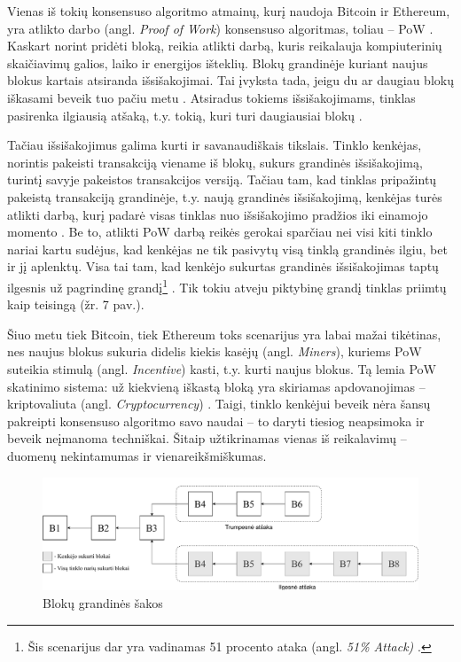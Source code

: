 Vienas iš tokių konsensuso algoritmo atmainų, kurį naudoja Bitcoin ir Ethereum, yra atlikto darbo (angl. \textit{Proof of Work}) konsensuso algoritmas, toliau – PoW \cite{gervais2016security}. Kaskart norint pridėti bloką, reikia atlikti darbą, kuris reikalauja kompiuterinių skaičiavimų galios, laiko ir energijos išteklių. Blokų grandinėje kuriant naujus blokus kartais atsiranda išsišakojimai. Tai įvyksta tada, jeigu du ar daugiau blokų iškasami beveik tuo pačiu metu \cite{zheng2017overview}. Atsiradus tokiems išsišakojimams, tinklas pasirenka ilgiausią atšaką, t.y. tokią, kuri turi daugiausiai blokų \cite{zheng2017overview}. 

Tačiau išsišakojimus galima kurti ir savanaudiškais tikslais. Tinklo kenkėjas, norintis pakeisti transakciją viename iš blokų, sukurs grandinės išsišakojimą, turintį savyje pakeistos transakcijos versiją. Tačiau tam, kad tinklas pripažintų pakeistą transakciją grandinėje, t.y. naują grandinės išsišakojimą, kenkėjas turės atlikti darbą, kurį padarė visas tinklas nuo išsišakojimo pradžios iki einamojo momento \cite{nakamoto2008bitcoin}. Be to, atlikti PoW darbą reikės gerokai sparčiau nei visi kiti tinklo nariai kartu sudėjus, kad kenkėjas ne tik pasivytų visą tinklą grandinės ilgiu, bet ir jį aplenktų. Visa tai tam, kad kenkėjo sukurtas grandinės išsišakojimas taptų ilgesnis už pagrindinę grandį\footnote{Šis scenarijus dar yra vadinamas 51 procento ataka (angl. \textit{51\% Attack)} \cite{baliga2017understanding}.} \cite{nakamoto2008bitcoin}. Tik tokiu atveju piktybinę grandį tinklas priimtų kaip teisingą (žr. 7 pav.).

Šiuo metu tiek Bitcoin, tiek Ethereum toks scenarijus yra labai mažai tikėtinas, nes naujus blokus sukuria didelis kiekis kasėjų (angl. \textit{Miners}), kuriems PoW suteikia stimulą (angl. \textit{Incentive}) kasti, t.y. kurti naujus blokus. Tą lemia PoW skatinimo sistema: už kiekvieną iškastą bloką yra skiriamas apdovanojimas – kriptovaliuta (angl. \textit{Cryptocurrency}) \cite{nakamoto2008bitcoin}. Taigi, tinklo kenkėjui beveik nėra šansų pakreipti konsensuso algoritmo savo naudai – to daryti tiesiog neapsimoka ir beveik neįmanoma techniškai. Šitaip užtikrinamas vienas iš reikalavimų – duomenų nekintamumas ir vienareikšmiškumas.

\begin{figure}[H]
    \centering
    \includegraphics[scale=0.5]{images/blockchain-branches}
    \caption{Blokų grandinės šakos \cite{zheng2017overview}}
\end{figure}



